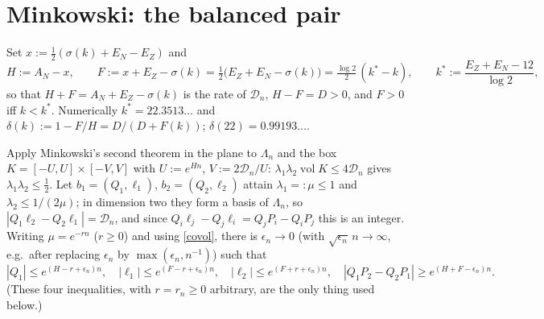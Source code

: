 \documentclass[11pt]{amsart}
\theoremstyle{remark}
\newcommand{\cD}{\mathcal D}\newcommand{\cK}{\mathcal K}
\begin{document}
\section{Minkowski: the balanced pair}
Set $x:=\tfrac12(\sigma(k)+E_N-E_Z)$ and
\[H:=A_N-x,\qquad F:=x+E_Z-\sigma(k)=\tfrac12\bigl(E_Z+E_N-\sigma(k)\bigr)=\tfrac{\log2}{2}\,(k^*-k),\qquad k^*:=\frac{E_Z+E_N-12}{\log2},\]
so that $H+F=A_N+E_Z-\sigma(k)$ is the rate of $\cD_n$, $H-F=D>0$, and $F>0$ iff $k<k^*$. Numerically $k^*=22.3513\ldots$ and $\delta(k):=1-F/H=D/(D+F(k))$; $\delta(22)=0.99193\ldots$.

Apply Minkowski's second theorem in the plane to $\Lambda_n$ and the box $K=[-U,U]\times[-V,V]$ with $U:=e^{Hn}$, $V:=2\cD_n/U$: $\lambda_1\lambda_2\operatorname{vol}K\le4\cD_n$ gives $\lambda_1\lambda_2\le\tfrac12$. Let $b_1=(Q_{1},\ell_{1})$, $b_2=(Q_{2},\ell_{2})$ attain $\lambda_1=:\mu\le1$ and $\lambda_2\le1/(2\mu)$; in dimension two they form a basis of $\Lambda_n$, so $|Q_1\ell_2-Q_2\ell_1|=\cD_n$, and since $Q_i\ell_j-Q_j\ell_i=Q_jP_i-Q_iP_j$ this is an integer. Writing $\mu=e^{-rn}$ ($r\ge0$) and using \eqref{covol}, there is $\epsilon_n\to0$ (with $\sqrt{\epsilon_n}\,n\to\infty$, e.g.\ after replacing $\epsilon_n$ by $\max(\epsilon_n,n^{-1})$) such that
\begin{equation}\label{mink}
|Q_1|\le e^{(H-r+\epsilon_n)n},\quad|\ell_1|\le e^{(F-r+\epsilon_n)n},\quad|\ell_2|\le e^{(F+r+\epsilon_n)n},\quad|Q_1P_2-Q_2P_1|\ge e^{(H+F-\epsilon_n)n}.
\end{equation}
(These four inequalities, with $r=r_n\ge0$ arbitrary, are the only thing used below.)
\end{document}
